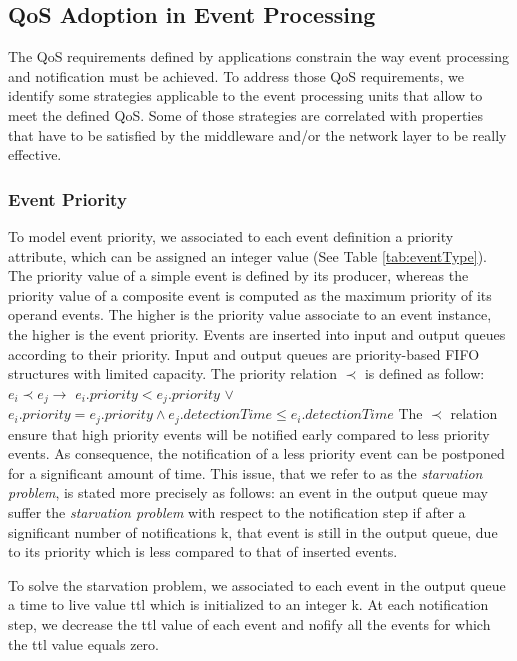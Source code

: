 \documentclass[a4paper,twoside]{article}
\begin{document}
\subsection{QoS Adoption in Event Processing}
\label{sec:qos_adoption} 
The QoS requirements defined by applications constrain the way event processing and notification must be achieved. To address those
QoS requirements, we identify some strategies applicable to the event processing units that allow to meet the defined QoS. Some of those strategies are correlated with properties that have to be satisfied by the middleware and/or the network layer to be really effective.

\subsubsection{Event Priority}
To model event priority, we associated to each event definition a priority attribute, which can be assigned an integer value (See Table \ref{tab:eventType}). The priority value of a simple event is defined by its producer, whereas the priority value of a composite event is computed as the maximum priority of its operand events. The higher is the priority value associate to an event instance, the higher is the event priority. Events are inserted into input and output queues according to their priority. Input and output queues are priority-based FIFO structures with limited capacity. The priority relation $\prec$ is defined as follow: \newline
$e_i \prec e_j \rightarrow$ \newline
$e_i .priority < e_{j}.priority$  $\vee$    \newline
$e_i .priority = e_{j}.priority \wedge e_j.detectionTime \leq e_i.detectionTime$ \newline
The $\prec$ relation ensure that high priority events will be notified early compared to less priority events. As consequence, the notification of a less priority event can be postponed for a significant amount of time. This issue, that we refer to as the \textit{starvation problem}, is stated more precisely as follows:
an event in the output queue may suffer the \textit{starvation problem} with respect to the notification step if after a significant number of notifications k, that event is still in the output queue, due to its priority which is less compared to that of inserted events. 

To solve the starvation problem, we associated to each event in the output queue a time to live value ttl which is initialized to an integer k. At each notification step, we decrease the ttl value of each event and nofify all the events for which the ttl value equals zero. 
\end{document}
